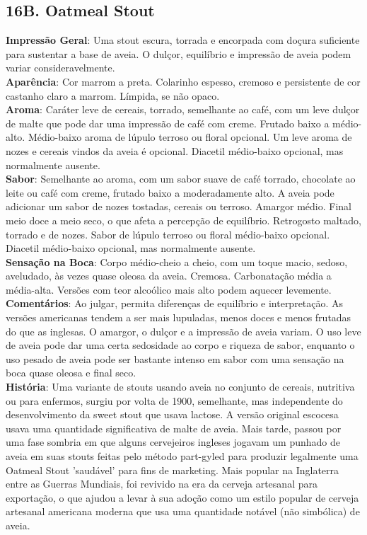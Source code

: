 \subsection*{16B. Oatmeal Stout}
\textbf{Impressão Geral}: Uma stout escura, torrada e encorpada com doçura suficiente para sustentar a base de aveia. O dulçor, equilíbrio e impressão de aveia podem variar consideravelmente. \\
\textbf{Aparência}: Cor marrom a preta. Colarinho espesso, cremoso e persistente de cor castanho claro a marrom. Límpida, se não opaco. \\
\textbf{Aroma}: Caráter leve de cereais, torrado, semelhante ao café, com um leve dulçor de malte que pode dar uma impressão de café com creme. Frutado baixo a médio-alto. Médio-baixo aroma de lúpulo terroso ou floral opcional. Um leve aroma de nozes e cereais vindos da aveia é opcional. Diacetil médio-baixo opcional, mas normalmente ausente. \\
\textbf{Sabor}: Semelhante ao aroma, com um sabor suave de café torrado, chocolate ao leite ou café com creme, frutado baixo a moderadamente alto. A aveia pode adicionar um sabor de nozes tostadas, cereais ou terroso. Amargor médio. Final meio doce a meio seco, o que afeta a percepção de equilíbrio. Retrogosto maltado, torrado e de nozes. Sabor de lúpulo terroso ou floral médio-baixo opcional. Diacetil médio-baixo opcional, mas normalmente ausente. \\
\textbf{Sensação na Boca}: Corpo médio-cheio a cheio, com um toque macio, sedoso, aveludado, às vezes quase oleosa da aveia. Cremosa. Carbonatação média a média-alta. Versões com teor alcoólico mais alto podem aquecer levemente. \\
\textbf{Comentários}: Ao julgar, permita diferenças de equilíbrio e interpretação. As versões americanas tendem a ser mais lupuladas, menos doces e menos frutadas do que as inglesas. O amargor, o dulçor e a impressão de aveia variam. O uso leve de aveia pode dar uma certa sedosidade ao corpo e riqueza de sabor, enquanto o uso pesado de aveia pode ser bastante intenso em sabor com uma sensação na boca quase oleosa e final seco. \\
\textbf{História}: Uma variante de stouts usando aveia no conjunto de cereais, nutritiva ou para enfermos, surgiu por volta de 1900, semelhante, mas independente do desenvolvimento da sweet stout que usava lactose. A versão original escocesa usava uma quantidade significativa de malte de aveia. Mais tarde, passou por uma fase sombria em que alguns cervejeiros ingleses jogavam um punhado de aveia em suas stouts feitas pelo método part-gyled para produzir legalmente uma Oatmeal Stout 'saudável' para fins de marketing. Mais popular na Inglaterra entre as Guerras Mundiais, foi revivido na era da cerveja artesanal para exportação, o que ajudou a levar à sua adoção como um estilo popular de cerveja artesanal americana moderna que usa uma quantidade notável (não simbólica) de aveia. \\
